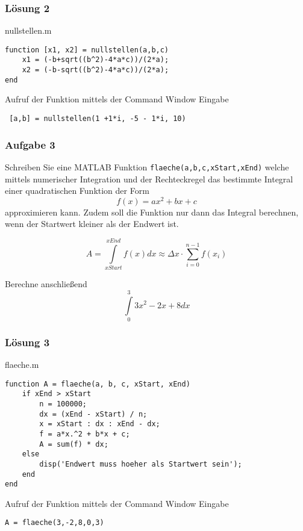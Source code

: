         \subsubsection*{Lösung 2}
        \begin{Codelösung}{nullstellen.m}
                \begin{lstlisting}
function [x1, x2] = nullstellen(a,b,c)
    x1 = (-b+sqrt((b^2)-4*a*c))/(2*a); 
    x2 = (-b-sqrt((b^2)-4*a*c))/(2*a); 
end
                \end{lstlisting}
        \end{Codelösung}
        \noindent Aufruf der Funktion mittels der Command Window Eingabe
        \begin{center}
        \texttt{
[a,b] = nullstellen(1 +1*i, -5 - 1*i, 10)}
        \end{center}
        \subsubsection*{Aufgabe 3}
        Schreiben Sie eine MATLAB Funktion \texttt{flaeche(a,b,c,xStart,xEnd)} welche mittels numerischer Integration und der Rechteckregel das bestimmte Integral einer quadratischen Funktion der Form \[f(x) = ax^2 + bx + c \] approximieren kann. Zudem soll die Funktion nur dann das Integral berechnen, wenn der Startwert kleiner als der Endwert ist.

        \[A=\int\limits_{xStart}^{xEnd}{f(x) dx} \approx \Delta x \cdot \sum_{i=0}^{n-1}f(x_i)\]

        Berechne anschließend
        \[\int\limits_{0}^{3}3x^2 - 2x +8 dx\]
        \subsubsection*{Lösung 3}
        \begin{Codelösung}{flaeche.m}
                \begin{lstlisting}
function A = flaeche(a, b, c, xStart, xEnd)
    if xEnd > xStart
        n = 100000;
        dx = (xEnd - xStart) / n;
        x = xStart : dx : xEnd - dx;
        f = a*x.^2 + b*x + c;
        A = sum(f) * dx;
    else
        disp('Endwert muss hoeher als Startwert sein');
    end
end
                \end{lstlisting}
        \end{Codelösung}

        \noindent Aufruf der Funktion mittels der Command Window Eingabe
        
        \begin{center}
                \texttt{A = flaeche(3,-2,8,0,3)}
        \end{center}
        